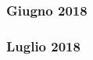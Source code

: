 
\subsubsection*{Giugno 2018}

\begin{mdframed}
	
\end{mdframed}


\subsubsection*{Luglio 2018}

\begin{mdframed}
	
\end{mdframed}




